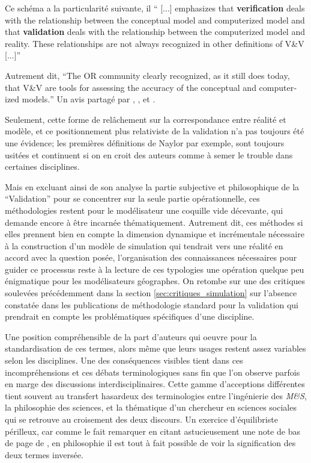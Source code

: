 Ce schéma a la particularité suivante, il \foreignquote{english}{ [...] emphasizes that \textbf{verification} deals with the relationship between the conceptual model and computerized model and that \textbf{validation} deals with the relationship between the computerized model and reality. These relationships are not always recognized in other definitions of V\&V [...]}

Autrement dit, \foreignquote{english}{The OR community clearly recognized, as it still does today, that V\&V are tools for assessing the accuracy of the conceptual and computerized models.} Un avis partagé par \textcite{Kleijnen1995}, \textcite{Balci1998}, et \textcite{Sargent2010}.

Seulement, cette forme de relâchement sur la correspondance entre réalité et modèle, et ce positionnement plus relativiste de la validation n'a pas toujours été une évidence; les premières définitions de Naylor par exemple, sont toujours usitées et continuent si on en croit des auteurs comme \textcite{Kleindorfer1998} à semer le trouble dans certaines disciplines.

Mais en excluant ainsi de son analyse la partie subjective et philosophique de la \enquote{Validation} pour se concentrer sur la seule partie opérationnelle, ces méthodologies restent pour le modélisateur une coquille vide décevante, qui demande encore à être incarnée thématiquement. Autrement dit, ces méthodes si elles prennent bien en compte la dimension dynamique et incrémentale nécessaire à la construction d'un modèle de simulation qui tendrait vers une réalité en accord avec la question posée, l'organisation des connaissances nécessaires pour guider ce processus reste à la lecture de ces typologies une opération quelque peu énigmatique pour les modélisateurs géographes. On retombe sur une des critiques soulevées précédemment dans la section \ref{sec:critiques_simulation} sur l'absence constatée dans les publications de méthodologie standard pour la validation qui prendrait en compte les problématiques spécifiques d'une discipline.

Une position compréhensible de la part d'auteurs qui oeuvre pour la standardisation de ces termes, alors même que leurs usages restent assez variables selon les disciplines. Une des conséquences visibles tient dans ces incompréhensions et ces débats terminologiques sans fin \autocites{David2009, Augusiak2014} que l'on observe parfois en marge des discussions interdisciplinaires. Cette gamme d'acceptions différentes tient souvent au transfert hasardeux des terminologies entre l'ingénierie des \textit{M\&S}, la philosophie des sciences, et la thématique d'un chercheur en sciences sociales qui se retrouve au croisement des deux discours. Un exercice d'équilibriste périlleux, car comme le fait remarquer \textcite{Kleijnen1995} en citant astucieusement une note de bas de page de \textcite{Barlas1990}, en philosophie il est tout à fait possible de voir la signification des deux termes inversée.

